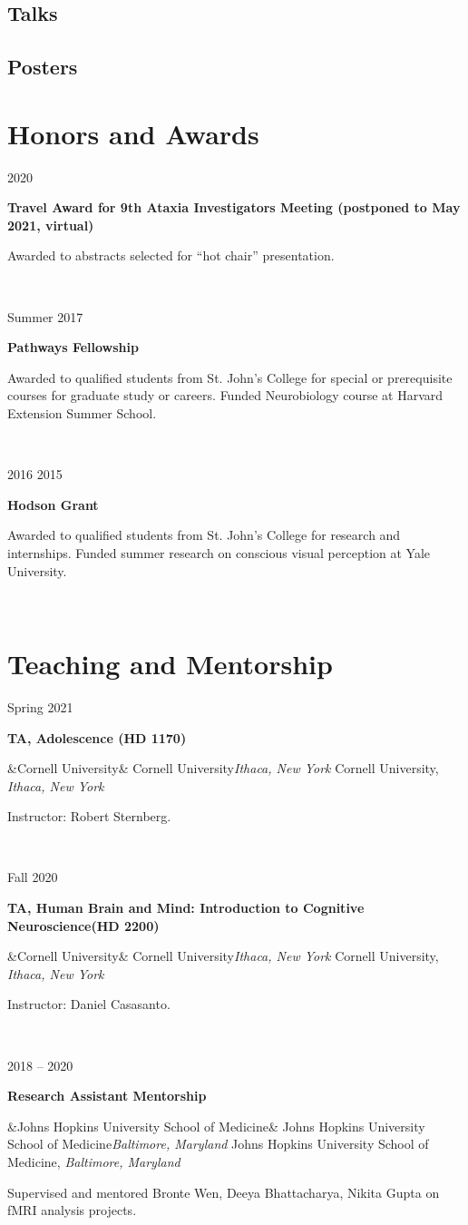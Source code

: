 \documentclass{article}
\newcommand{\entry}[5]{

  \begin{minipage}[t]{.15\textwidth}
    \begin{flushright}
      \hfill {#1}
    \end{flushright}
  \end{minipage}
  \hfill\vline\hfill
  \begin{minipage}[t]{.80\textwidth}
    \textbf{#2}

    \ifx&#3&
      {#3}\textit{#4}
    \else
      {#3, }\textit{#4}

    \fi
    \footnotesize{#5}
  \end{minipage}\\\vspace{.25cm}
}
\newcommand{\awardentry}[3]{
  \begin{minipage}[t]{.15\textwidth}
    \begin{flushright}
      \hfill {#1}
    \end{flushright}
  \end{minipage}
  \hfill\vline\hfill
  \begin{minipage}[t]{.80\textwidth}
    \textbf{#2}

    \footnotesize{#3}
  \end{minipage}\\\vspace{.25cm}
}
\newcommand{\cu}{Cornell University}
\newcommand{\jhusom}{Johns Hopkins University School of Medicine}
\begin{document}
\subsection{Talks}
\newrefsection[talks]
\nocite{*}
\printbibliography[heading=none]

\subsection{Posters}
\newrefsection[talks]
\nocite{*}
\printbibliography[heading=none]


\section{Honors and Awards}

\awardentry{2020}{Travel Award for 9th Ataxia Investigators Meeting (postponed to May 2021, virtual)}
{Awarded to abstracts selected for “hot chair” presentation.}

\awardentry{Summer 2017}{Pathways Fellowship}
{Awarded to qualified students from St. John’s College for special or prerequisite courses for graduate study or careers. Funded Neurobiology course at Harvard Extension Summer School.}

\awardentry{2016 2015}{Hodson Grant}
{Awarded to qualified students from St. John’s College for research and internships. Funded summer research on conscious visual perception at Yale University.}

\section{Teaching and Mentorship}

\entry{Spring 2021}{TA, Adolescence (HD 1170)}
{\cu}{Ithaca, New York}
{Instructor: Robert Sternberg.}

\entry{Fall 2020}{TA, Human Brain and Mind: Introduction to Cognitive Neuroscience\linebreak(HD 2200)}
{\cu}{Ithaca, New York}
{Instructor: Daniel Casasanto.}

\entry{2018 -- 2020}{Research Assistant Mentorship}
{\jhusom}{Baltimore, Maryland}
{Supervised and mentored Bronte Wen, Deeya Bhattacharya, Nikita Gupta on fMRI analysis projects.}
\end{document}
